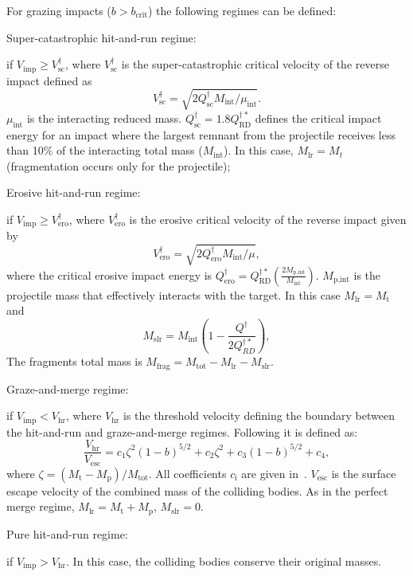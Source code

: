 \documentclass[fleqn,usenatbib]{mnras}
\begin{document}
\begin{enumerate}
    
For grazing impacts ($b > b_{\text{crit}}$) the following regimes can be defined:


   {\bf  \item Super-catastrophic hit-and-run regime:} if $V_{\text{imp}} \geq V^{\dagger}_{\text{sc}}$, where $V^{\dagger}_{\text{sc}}$ is the super-catastrophic critical  velocity of the reverse impact defined as
\begin{equation}
V^{\dagger}_{\text{sc}} = \sqrt{2Q^{\dagger}_{\text{sc}}M_{\text{int}}/\mu_{\text{int}}}.
\end{equation}
$\mu_{\text{int}}$ is the interacting reduced mass. $Q^{\dagger}_{\text{sc}} = 1.8Q^{\dagger*}_{\text{RD}}$ defines the critical impact energy for an impact where the largest remnant from the projectile receives less than 10\% of the interacting total mass ($M_{\text{int}}$). In this case, $M_{\text{lr}} = M_t$ (fragmentation occurs only for the projectile);

  {\bf   \item Erosive hit-and-run regime:} if $V_{\text{imp}} \geq V^{\dagger}_{\text{ero}}$, where $V^{\dagger}_{\text{ero}}$ is the erosive critical velocity of the reverse impact given by
\begin{equation}
V^{\dagger}_{\text{ero}} = \sqrt{2Q^{\dagger}_{\text{ero}}M_{\text{int}}/\mu},
\end{equation}
    where the critical erosive impact energy is $Q^{\dagger}_{\text{ero}} = Q^{\dagger*}_{\text{RD}}\left (\frac{2M_{\text{p,int}}}{M_{\text{int}}}\right )$. $M_{\text{p,int}}$ is the projectile mass that effectively interacts with the target. In this case $M_{\text{lr}}=M_{\text{t}}$ and 
    \begin{equation}
    M_{\text{slr}} = M_{\text{int}}\left (1- \frac{Q^{\dagger}}{2Q^{\dagger*}_{RD}} \right ),
    \end{equation}
    The fragments total mass is $M_{\text{frag}} = M_{\text{tot}}-M_{\text{lr}}-M_{\text{slr}}$. 

 {\bf    \item Graze-and-merge regime:} if $V_{\text{imp}} < V_{\text{hr}}$, where $V_{\text{hr}}$ is the threshold velocity defining the boundary between the hit-and-run and graze-and-merge regimes. Following \cite{kokubogenda10} it is defined as:
\begin{equation}
\frac{V_{\text{hr}}}{V_{\text{esc}}}= c_1 \zeta^2 (1-b)^{5/2}+c_2\zeta^2 + c_3(1-b)^{5/2}+c_4,
\end{equation}
    where $\zeta = (M_{\text{t}} - M_{\text{p}})/M_{\text{tot}}$. All coefficients $c_{\text{i}}$ are given in~\cite{gendakokuboida12}. $V_{\text{esc}}$ is the surface escape velocity of the combined mass of the colliding bodies. As in the perfect merge regime, $M_{\text{lr}}=M_{\text{t}}+M_{\text{p}}$, $M_{\text{slr}}=0$.

{\bf     \item Pure hit-and-run regime:} if $V_{\text{imp}} > V_{\text{hr}}$. In this case, the colliding bodies conserve their original masses.\\
\end{enumerate}
\end{document}
